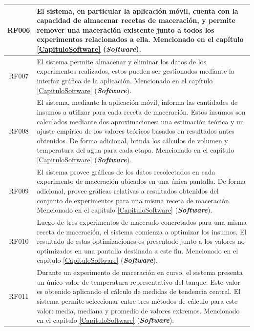 \begin{longtable}{|p{3cm}|p{11cm}|}
        \multicolumn{1}{|c|}{RF006}  & El sistema, en particular la aplicación móvil, cuenta con la capacidad de almacenar recetas de maceración, y permite remover una maceración existente junto a todos los experimentos relacionados a ella. Mencionado en el capítulo \ref{CapituloSoftware} (\textit{\textbf{Software}}). \\
        \hline
        
        \multicolumn{1}{|c|}{RF007} & El sistema permite almacenar y eliminar los datos de los experimentos realizados, estos pueden ser gestionados mediante la interfaz gráfica de la aplicación. Mencionado en el capítulo \ref{CapituloSoftware} (\textit{\textbf{Software}}). \\
        \hline
        
        \multicolumn{1}{|c|}{RF008} & El sistema, mediante la aplicación móvil, informa las cantidades de insumos a utilizar para cada receta de maceración. Estos insumos son calculados mediante dos aproximaciones: una estimación teórica y un ajuste empírico de los valores teóricos basados en resultados antes obtenidos. De forma adicional, brinda los cálculos de volumen y temperatura del agua para cada etapa. Mencionado en el capítulo \ref{CapituloSoftware} (\textit{\textbf{Software}}). \\
        \hline 
        
        \multicolumn{1}{|c|}{RF009} & El sistema provee gráficas de los datos recolectados en cada experimento de maceración ubicados en una única pantalla. De forma adicional, provee gráficas relativas a resultados obtenidos del conjunto de experimentos para una misma receta de maceración. Mencionado en el capítulo \ref{CapituloSoftware} (\textit{\textbf{Software}}). \\
        \hline
        
        \multicolumn{1}{|c|}{RF010} & Luego de tres experimentos de macerado concretados para una misma receta de maceración, el sistema comienza a optimizar los insumos. El resultado de estas optimizaciones es presentado junto a los valores no optimizados en una pantalla destinada a este fin. Mencionado en el capítulo \ref{CapituloSoftware} (\textit{\textbf{Software}}). \\
        \hline
        
        \multicolumn{1}{|c|}{RF011} & Durante un experimento de maceración en curso, el sistema presenta un único valor de temperatura representativo del tanque. Este valor es obtenido aplicando el cálculo de medidas de tendencia central. El sistema permite seleccionar entre tres métodos de cálculo para este valor: media, mediana  y  promedio  de  valores extremos. Mencionado en el capítulo \ref{CapituloSoftware} (\textit{\textbf{Software}}). \\
        \hline
        

\end{longtable}
